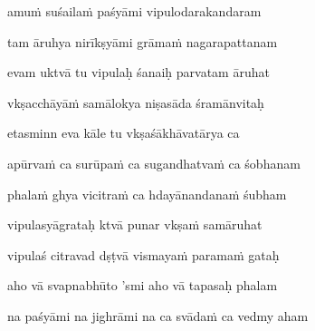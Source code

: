amuṁ suśailaṁ paśyāmi vipulodarakandaram\thinspace{\dandab} \dontdisplaylinenum
{}

tam āruhya nirīkṣyāmi grāmaṁ nagarapattanam \veg\dontdisplaylinenum
{}

evam uktvā tu vipulaḥ śanaiḥ parvatam āruhat\thinspace{\dandab} \dontdisplaylinenum
{}

vkṣacchāyāṁ samālokya niṣasāda śramānvitaḥ \veg\dontdisplaylinenum
{}

etasminn eva kāle tu vkṣaśākhāvatārya ca\thinspace{\dandab} \dontdisplaylinenum
{}

apūrvaṁ ca surūpaṁ ca sugandhatvaṁ ca śobhanam \veg\dontdisplaylinenum
{}

phalaṁ ghya vicitraṁ ca hdayānandanaṁ śubham\thinspace{\dandab} \dontdisplaylinenum

vipulasyāgrataḥ ktvā punar vkṣaṁ samāruhat \veg\dontdisplaylinenum
{}

vipulaś citravad dṣṭvā vismayaṁ paramaṁ gataḥ\thinspace{\dandab} \dontdisplaylinenum
{}

aho vā svapnabhūto 'smi aho vā tapasaḥ phalam \veg\dontdisplaylinenum
{}

na paśyāmi na jighrāmi na ca svādaṁ ca vedmy aham\thinspace{\dandab} \dontdisplaylinenum
{}

